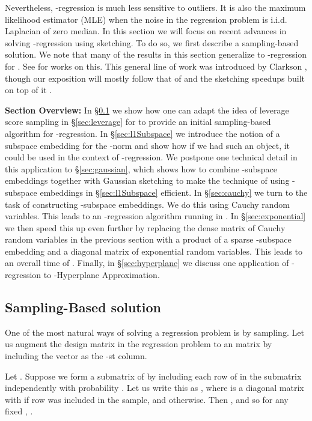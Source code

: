 \documentclass[11pt]{article}
\begin{document}
Nevertheless, -regression is much less sensitive to outliers. It is also the maximum
likelihood estimator (MLE) when the noise in the regression problem is i.i.d. Laplacian of
zero median. In this section we will focus on recent advances in solving -regression
using sketching. To do so, we first describe a sampling-based solution. We note that many of the
results in this section generalize to -regression for . See 
\cite{CW13,MM13,wz13} for works on this. This general line of work was introduced by
Clarkson \cite{Cla05}, though our exposition will mostly follow that of \cite{DDHKM09} and the
sketching speedups built on top of it \cite{sw11,CDMMMW13,MM13,wz13}. 

{\bf Section Overview:} In \S\ref{sec:sampling-Based} we show how one can adapt the idea of leverage score sampling in \S\ref{sec:leverage} for  to provide an initial sampling-based algorithm for -regression. In \S\ref{sec:l1Subspace} we introduce the notion of a subspace embedding for the -norm and show how if we had such an object, it could be used in the context of -regression. We postpone one technical detail in this application to \S\ref{sec:gaussian}, which shows how to combine -subspace embeddings together with Gaussian sketching to make the technique of using -subspace embeddings in \S\ref{sec:l1Subspace} efficient. In \S\ref{sec:cauchy} we turn to the task of constructing -subspace embeddings. We do this using Cauchy random variables. This leads to an -regression algorithm running in . In \S\ref{sec:exponential} we then speed this up even further by replacing the dense matrix of Cauchy random variables in the previous section with a product of a sparse -subspace embedding and a diagonal matrix of exponential random variables. This leads to an overall time of . Finally, in \S\ref{sec:hyperplane} we discuss one application of -regression to -Hyperplane Approximation. 

\subsection{Sampling-Based solution}\label{sec:sampling-Based}
One of the most natural ways of solving a regression problem is by sampling. Let us augment
the  design matrix  in the regression problem to an  matrix
by including the  vector as the -st column. 

Let . 
Suppose we form a submatrix of  by including each row of  in the submatrix independently
with probability . Let us write this as , where  is a diagonal  matrix
with  if row  was included in the sample, and  otherwise. Then
, and so for any fixed , . 
\end{document}
